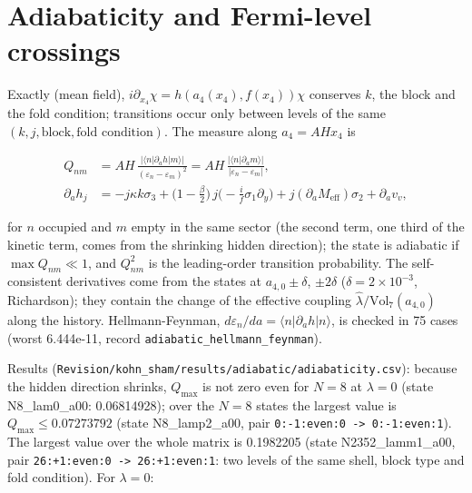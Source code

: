 \documentclass[11pt]{article}
\begin{document}
\endgroup

\section{Adiabaticity and Fermi-level crossings}

Exactly (mean field), $i\partial_{x_4}\chi = h(a_4(x_4), f(x_4))\chi$ conserves $k$, the block and the fold condition; transitions occur only between levels of the same $(k, j, \text{block}, \text{fold condition})$. The measure along $a_4 = AHx_4$ is

\[
\begin{aligned}
Q_{nm} &= AH\,\frac{\lvert\langle n\rvert\partial_ah\lvert m\rangle\rvert}{(\varepsilon_n - \varepsilon_m)^2} = AH\,\frac{\lvert\langle n\vert\partial_am\rangle\rvert}{\lvert\varepsilon_n - \varepsilon_m\rvert},\\
\partial_ah_j &= -j\kappa k\sigma_3 + \big(1 - \tfrac{\beta}{2}\big)\,j\big(-\tfrac{i}{f}\sigma_1\partial_y\big) + j(\partial_aM_{\mathrm{eff}})\sigma_2 + \partial_av_v ,
\end{aligned}
\]

for $n$ occupied and $m$ empty in the same sector (the second term, one third of the kinetic term, comes from the shrinking hidden direction); the state is adiabatic if $\max Q_{nm} \ll 1$, and $Q_{nm}^2$ is the leading-order transition probability. The self-consistent derivatives come from the states at $a_{4,0} \pm \delta$, $\pm 2\delta$ ($\delta = 2\times10^{-3}$, Richardson); they contain the change of the effective coupling $\hat\lambda/\mathrm{Vol}_7(a_{4,0})$ along the history. Hellmann-Feynman, $d\varepsilon_n/da = \langle n\rvert\partial_ah\lvert n\rangle$, is checked in 75 cases (worst 6.444e-11, record \texttt{adiabati\allowbreak{}c\_hellma\allowbreak{}nn\_feynm\allowbreak{}an}).

Results (\texttt{Revision\allowbreak{}/kohn\_sh\allowbreak{}am/resul\allowbreak{}ts/adiab\allowbreak{}atic/adi\allowbreak{}abaticit\allowbreak{}y.csv}): because the hidden direction shrinks, $Q_{\max}$ is not zero even for $N = 8$ at $\lambda = 0$ (state N8\_lam0\_a00: 0.06814928); over the $N = 8$ states the largest value is $Q_{\max} \leq 0.07273792$ (state N8\_lamp2\_a00, pair \texttt{0:-1:eve\allowbreak{}n:0 -> 0\allowbreak{}:-1:even\allowbreak{}:1}). The largest value over the whole matrix is 0.1982205 (state N2352\_lamm1\_a00, pair \texttt{26:+1:ev\allowbreak{}en:0 -> \allowbreak{}26:+1:ev\allowbreak{}en:1}: two levels of the same shell, block type and fold condition). For $\lambda = 0$:
\end{document}
